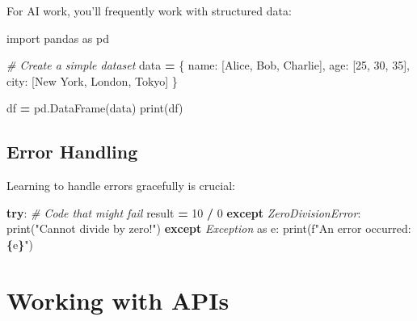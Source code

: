 \documentclass[
]{book}
\newenvironment{Shaded}{\begin{snugshade}}{\end{snugshade}}
\newcommand{\BuiltInTok}[1]{#1}
\newcommand{\CommentTok}[1]{\textcolor[rgb]{0.56,0.35,0.01}{\textit{#1}}}
\newcommand{\ControlFlowTok}[1]{\textcolor[rgb]{0.13,0.29,0.53}{\textbf{#1}}}
\newcommand{\DecValTok}[1]{\textcolor[rgb]{0.00,0.00,0.81}{#1}}
\newcommand{\ImportTok}[1]{#1}
\newcommand{\NormalTok}[1]{#1}
\newcommand{\OperatorTok}[1]{\textcolor[rgb]{0.81,0.36,0.00}{\textbf{#1}}}
\newcommand{\PreprocessorTok}[1]{\textcolor[rgb]{0.56,0.35,0.01}{\textit{#1}}}
\newcommand{\SpecialCharTok}[1]{\textcolor[rgb]{0.81,0.36,0.00}{\textbf{#1}}}
\newcommand{\SpecialStringTok}[1]{\textcolor[rgb]{0.31,0.60,0.02}{#1}}
\newcommand{\StringTok}[1]{\textcolor[rgb]{0.31,0.60,0.02}{#1}}
\begin{document}
For AI work, you'll frequently work with structured data:

\begin{Shaded}
\begin{Highlighting}[]
\ImportTok{import}\NormalTok{ pandas }\ImportTok{as}\NormalTok{ pd}

\CommentTok{\# Create a simple dataset}
\NormalTok{data }\OperatorTok{=}\NormalTok{ \{}
    \StringTok{\textquotesingle{}name\textquotesingle{}}\NormalTok{: [}\StringTok{\textquotesingle{}Alice\textquotesingle{}}\NormalTok{, }\StringTok{\textquotesingle{}Bob\textquotesingle{}}\NormalTok{, }\StringTok{\textquotesingle{}Charlie\textquotesingle{}}\NormalTok{],}
    \StringTok{\textquotesingle{}age\textquotesingle{}}\NormalTok{: [}\DecValTok{25}\NormalTok{, }\DecValTok{30}\NormalTok{, }\DecValTok{35}\NormalTok{],}
    \StringTok{\textquotesingle{}city\textquotesingle{}}\NormalTok{: [}\StringTok{\textquotesingle{}New York\textquotesingle{}}\NormalTok{, }\StringTok{\textquotesingle{}London\textquotesingle{}}\NormalTok{, }\StringTok{\textquotesingle{}Tokyo\textquotesingle{}}\NormalTok{]}
\NormalTok{\}}

\NormalTok{df }\OperatorTok{=}\NormalTok{ pd.DataFrame(data)}
\BuiltInTok{print}\NormalTok{(df)}
\end{Highlighting}
\end{Shaded}

\subsection{Error Handling}\label{error-handling}

Learning to handle errors gracefully is crucial:

\begin{Shaded}
\begin{Highlighting}[]
\ControlFlowTok{try}\NormalTok{:}
    \CommentTok{\# Code that might fail}
\NormalTok{    result }\OperatorTok{=} \DecValTok{10} \OperatorTok{/} \DecValTok{0}
\ControlFlowTok{except} \PreprocessorTok{ZeroDivisionError}\NormalTok{:}
    \BuiltInTok{print}\NormalTok{(}\StringTok{"Cannot divide by zero!"}\NormalTok{)}
\ControlFlowTok{except} \PreprocessorTok{Exception} \ImportTok{as}\NormalTok{ e:}
    \BuiltInTok{print}\NormalTok{(}\SpecialStringTok{f"An error occurred: }\SpecialCharTok{\{}\NormalTok{e}\SpecialCharTok{\}}\SpecialStringTok{"}\NormalTok{)}
\end{Highlighting}
\end{Shaded}

\section{Working with APIs}\label{working-with-apis}
\end{document}
